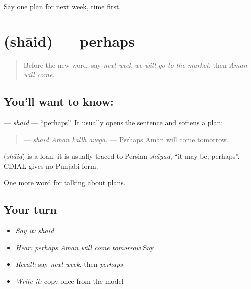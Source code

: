 \begin{tcolorbox}[breakable,colback=teal!4,colframe=teal!35!black,title={Before you move on}]
Say one plan for next week, time first.
\end{tcolorbox}
\section[\texorpdfstring{\pa{ਸ਼ਾਇਦ} (shāid)}{ਸ਼ਾਇਦ (shāid)}]{ (shāid) — perhaps}

\label{lesson:PA-C223-shaid}



\begin{quote}
Before the new word: say \emph{next week we will go to the market}, then \emph{Aman will come}.
\end{quote}

\subsection*{You'll want to know: }
\textbf{} — \emph{shāid} — \textquotedblleft{}perhaps\textquotedblright{}. It usually opens the sentence and softens a plan:

\begin{quote}
\textbf{   } — \emph{shāid Aman kallh āvegā.} — Perhaps Aman will come tomorrow.
\end{quote}

\begin{cousinweb}
\textbf{} (\emph{shāid}) is a loan: it is usually traced to Persian \emph{shāyad}, \textquotedblleft{}it may be; perhaps\textquotedblright{}. CDIAL gives no Punjabi form.
\end{cousinweb}

\begin{grammarlens}[title={What you've built}]
One more word for talking about plans.
\end{grammarlens}

\subsection*{Your turn}
\begin{itemize}
\raggedright
  \item \emph{Say it:} \emph{shāid}
  \item \emph{Hear:} \emph{perhaps Aman will come tomorrow} Say \textbf{   }
  \item \emph{Recall:} say \emph{next week}, then \emph{perhaps}
  \item \emph{Write it:} copy \textbf{} once from the model
\end{itemize}

